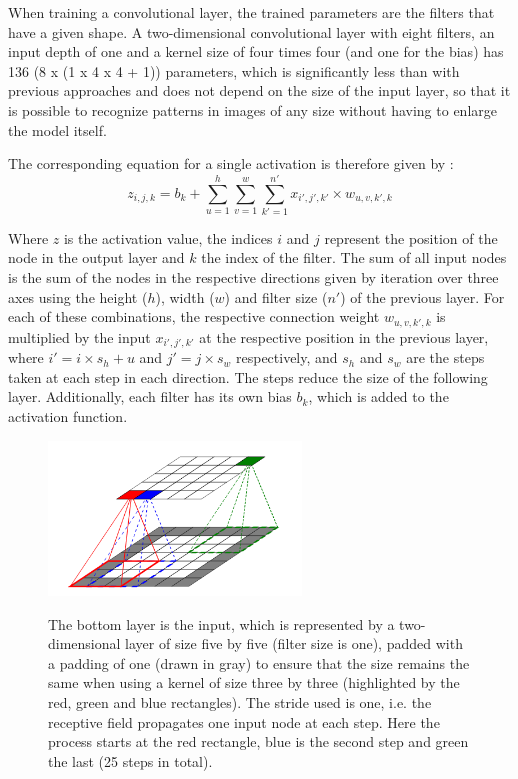 When training a convolutional layer, the trained parameters are the filters that have a given shape.
A two-dimensional convolutional layer with eight filters, an input depth of one and a kernel size of four times four (and one for the bias) has 136 (8 x (1 x 4 x 4 + 1)) parameters, which is significantly less than with previous approaches and does not depend on the size of the input layer, so that it is possible to recognize patterns in images of any size without having to enlarge the model itself.

The corresponding equation for a single activation is therefore given by \cite [p. 453]{Geron2019}:
\begin{equation}
z_{i,j,k} = b_k + \sum_{u=1}^{h} \sum_{v=1}^{w} \sum_{k'=1}^{n'} x_{i', j', k'} \times w_{u, v, k', k} 
\end{equation}

Where $z$ is the activation value, the indices $i$ and $j$ represent the position of the node in the output layer and $k$ the index of the filter.
The sum of all input nodes is the sum of the nodes in the respective directions given by iteration over three axes using the height ($h$), width ($w$) and filter size ($n'$) of the previous layer.
For each of these combinations, the respective connection weight $w_{u, v, k', k}$ is multiplied by the input $x_{i', j', k'}$ at the respective position in the previous layer, where $i' = i \times s_h + u$ and $j' = j \times s_w$ respectively, and $s_h$ and $s_w$ are the steps taken at each step in each direction.
The steps reduce the size of the following layer.
Additionally, each filter has its own bias $b_k$, which is added to the activation function.

\begin{figure}
    \centering
    \caption{  The bottom layer is the input, which is represented by a two-dimensional layer of size five by five (filter size is one), padded with a padding of one (drawn in gray) to ensure that the size remains the same when using a kernel of size three by three (highlighted by the red, green and blue rectangles). The stride used is one, i.e. the receptive field propagates one input node at each step. Here the process starts at the red rectangle, blue is the second step and green the last (25 steps in total). }
    \includegraphics[width=0.6\textwidth]{images/conv_layer.png}
    \label{fig:conv_layer}
\end{figure}

